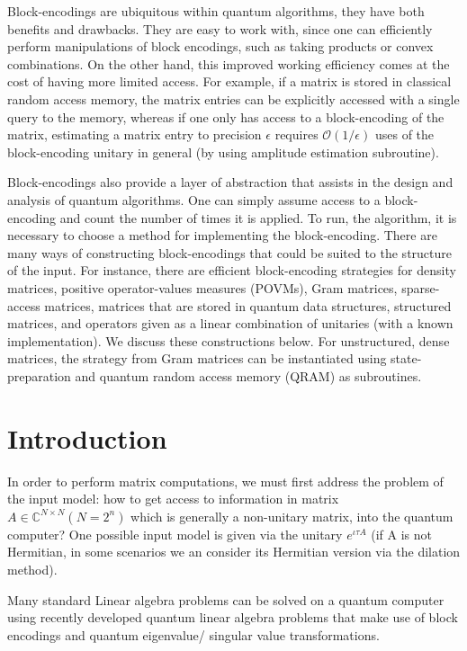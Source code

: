 \documentclass[12pt, oneside]{book}
\theoremstyle{definition}
\theoremstyle{definition}
\theoremstyle{remark}
\begin{document}
Block-encodings are ubiquitous within quantum algorithms, they have both benefits and drawbacks. They are easy to work with, since one can efficiently perform manipulations of block encodings, such as taking products or convex combinations. On the other hand, this improved working efficiency comes at the cost of having more limited access. For example, if a matrix is stored in classical random access memory, the matrix entries can be explicitly accessed with a single query to the memory, whereas if one only has access to a block-encoding of the matrix, estimating a matrix entry to precision $\epsilon$ requires $\mathcal{O}(1/\epsilon)$ uses of the block-encoding unitary in general (by using amplitude estimation subroutine).

Block-encodings also provide a layer of abstraction that assists in the design and analysis of quantum algorithms. One can simply assume access to a block-encoding and count the number of times it is applied. To run, the algorithm, it is necessary to choose a method for implementing the block-encoding. There are many ways of constructing block-encodings that could be suited to the structure of the input. For instance, there are efficient block-encoding strategies for density matrices, positive operator-values measures (POVMs), Gram matrices, sparse-access matrices, matrices that are stored in quantum data structures, structured matrices, and operators given as a linear combination of unitaries (with a known implementation). We discuss these constructions below. For unstructured, dense matrices, the strategy from Gram matrices can be instantiated using state-preparation and quantum random access memory (QRAM) as subroutines.


\section{Introduction}

In order to perform matrix computations, we must first address the problem of the input model: how to get access to information in matrix $A\in \mathbb{C}^{N \times N} (N=2^n)$ which is generally a non-unitary matrix, into the quantum computer? One possible input model is given via the unitary $e^{\iota \tau A}$ (if A is not Hermitian, in some scenarios we an consider its Hermitian version via the dilation method).

Many standard Linear algebra problems can be solved on a quantum computer using recently developed quantum linear algebra problems that make use of block encodings and quantum eigenvalue/ singular value transformations. 
\end{document}

